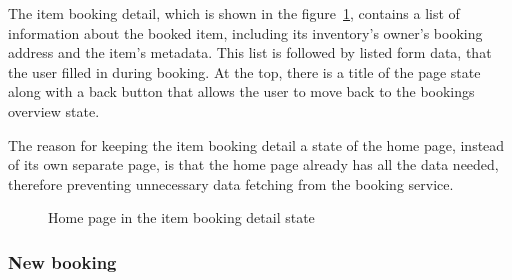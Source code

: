 The item booking detail, which is shown in the figure~\ref{fig:home_page_booking_details}, contains a list of information about the booked item, including its inventory's owner's booking address and the item's metadata. This list is followed by listed form data, that the user filled in during booking. At the top, there is a title of the page state along with a back button that allows the user to move back to the bookings overview state.

The reason for keeping the item booking detail a state of the home page, instead of its own separate page, is that the home page already has all the data needed, therefore preventing unnecessary data fetching from the booking service.

\begin{figure}
    \centering
    \caption[Home page -- Item booking detail]{Home page in the item booking detail state}
    \label{fig:home_page_booking_details}
\end{figure}

\subsubsection{New booking}

